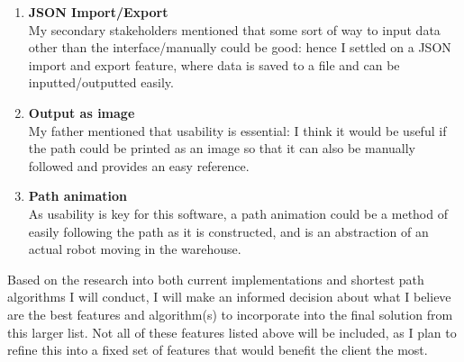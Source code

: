 \begin{enumerate}
	\item \textbf{JSON Import/Export}\\
	My secondary stakeholders mentioned that some sort of way to input data other than the interface/manually could be good: hence I settled on a JSON import and export feature, where data is saved to a file and can be inputted/outputted easily.
	
	\item \textbf{Output as image}\\
	My father mentioned that usability is essential: I think it would be useful if the path could be printed as an image so that it can also be manually followed and provides an easy reference.
	
	\item \textbf{Path animation}\\
	As usability is key for this software, a path animation could be a method of easily following the path as it is constructed, and is an abstraction of an actual robot moving in the warehouse.
	
\end{enumerate}


Based on the research into both current implementations and shortest path algorithms I will conduct, I will make an informed decision about what I believe are the best features and algorithm(s) to incorporate into the final solution from this larger list. Not all of these features listed above will be included, as I plan to refine this into a fixed set of features that would benefit the client the most.